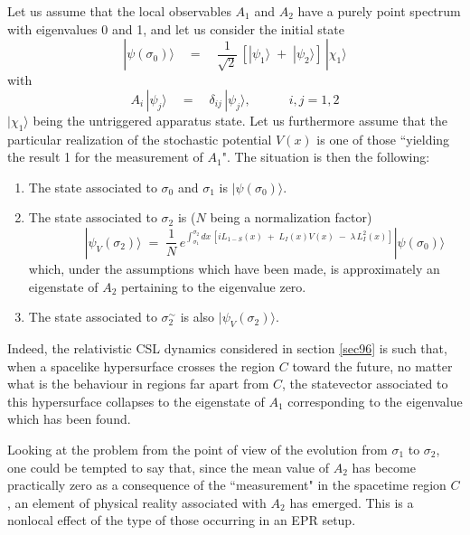 \documentclass[12pt]{article}
\begin{document}
Let us assume that the local observables $A_{1}$ and $A_{2}$ have
a purely point spectrum with eigenvalues 0 and 1, and let us
consider the initial state
\begin{equation}
|\psi(\sigma_{0})\rangle \quad = \quad \frac{1}{\sqrt{2}}\, [
|\psi_{1}\rangle \; + \; |\psi_{2}\rangle ]\, |\chi_{1}\rangle
\end{equation}
with
\begin{equation}
A_{i}\, |\psi_{j}\rangle \quad = \quad \delta_{ij}\,
|\psi_{j}\rangle, \qquad\quad i, j = 1, 2
\end{equation}
$|\chi_{1}\rangle$ being the untriggered apparatus state. Let us
furthermore assume that the particular realization of the
stochastic potential $V(x)$ is one of those ``yielding the result
1 for the measurement of $A_{1}$". The situation is then the
following:
\begin{enumerate}
\item The state associated to $\sigma_{0}$ and $\sigma_{1}$ is
$|\psi(\sigma_{0})\rangle$.
\item The state associated to $\sigma_{2}$ is ($N$ being a
normalization factor)
\begin{equation} \qquad\quad
|\psi_{V}(\sigma_{2})\rangle \; = \; \frac{1}{N}\,
e^{\displaystyle \int_{\sigma_{1}}^{\sigma_{2}} dx\, [i L_{1-S}(x)
\; + \; L_{I}(x)V(x)\; - \; \lambda\, L_{I}^{2}(x)]}
|\psi(\sigma_{0})\rangle
\end{equation}
which, under the assumptions which have been made, is
approximately an eigenstate of $A_{2}$ pertaining to the
eigenvalue zero.
\item The state associated to $\sigma_{2}^{\sim}$ is also
$|\psi_{V}(\sigma_{2})\rangle$.
\end{enumerate}
Indeed, the relativistic CSL dynamics considered in section
\ref{sec96} is such that, when a spacelike hypersurface crosses
the region $C$ toward the future, no matter what is the behaviour
in regions far apart from $C$, the statevector associated to this
hypersurface collapses to the eigenstate of $A_{1}$ corresponding
to the eigenvalue which has been found.

Looking at the problem from the point of view of the evolution
from $\sigma_{1}$ to $\sigma_{2}$, one could be tempted to say
that, since the mean value of $A_{2}$ has become practically zero
as a consequence of the ``measurement" in the spacetime region
$C$, an element of physical reality associated with $A_{2}$ has
emerged. This is a nonlocal effect of the type of those occurring
in an EPR setup.
\end{document}
